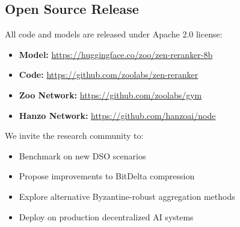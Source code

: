 \subsection{Open Source Release}

All code and models are released under Apache 2.0 license:

\begin{itemize}
\item \textbf{Model:} \url{https://huggingface.co/zoo/zen-reranker-8b}
\item \textbf{Code:} \url{https://github.com/zoolabs/zen-reranker}
\item \textbf{Zoo Network:} \url{https://github.com/zoolabs/gym}
\item \textbf{Hanzo Network:} \url{https://github.com/hanzoai/node}
\end{itemize}

We invite the research community to:
\begin{itemize}
\item Benchmark on new DSO scenarios
\item Propose improvements to BitDelta compression
\item Explore alternative Byzantine-robust aggregation methods
\item Deploy on production decentralized AI systems
\end{itemize}

